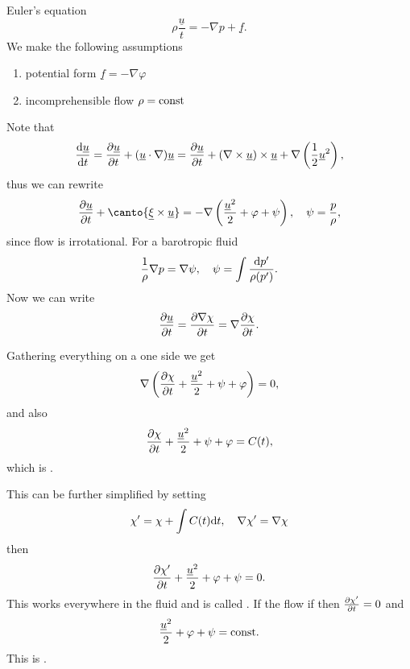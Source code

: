 \documentclass[11pt,oneside]{book}
\renewcommand{\vec}[1]{\underline{#1}}
\theoremstyle{definition} %
\theoremstyle{plain} %
\theoremstyle{remark} %
\theoremstyle{underline}
\newcommand\Ccancel[2][black]{
    \let\OldcancelColor\CancelColor
    \renewcommand\CancelColor{\color{#1}}
    \cancel{#2}
    \renewcommand\CancelColor{\OldcancelColor}
}
\let\OldcancelColor\CancelColor
\renewcommand\CancelColor{\color{#1}}
\renewcommand\CancelColor{\OldcancelColor}
\begin{document}
  Euler's equation
  \begin{displaymath}
    \rho\dfrac{\vec u}{t} = - \nabla p + \vec f.
  \end{displaymath}
  We make the following assumptions
  \begin{enumerate}
    \item potential form $\vec f = - \nabla \varphi$
    \item incomprehensible flow $\rho = \textrm{const}$
  \end{enumerate}
  Note that
  \begin{displaymath}
    \dfrac{\vec u}{t} = \ptf{\vec u}{t} + (\vec u \cdot \nabla ) \vec u 
    = \ptf{\vec u}{t} + (\nabla \times \vec u) \times \vec u + \nabla \left( \frac{1}{2} \vec u^2 \right),
  \end{displaymath}
  thus we can rewrite
  \begin{displaymath}
    \ptf{\vec u}{t} + 
    \canto{\vec \xi \times \vec u}
    = - \nabla \left( \frac{\vec u^2}{2} + \varphi + \psi\right) , \quad \psi = \frac{p}{\rho},
  \end{displaymath}
  since flow is irrotational.
  For a barotropic fluid
  \begin{displaymath}
    \frac{1}{\rho} \nabla p = \nabla \psi, \quad \psi = \int\frac{\mathrm{d} p'}{\rho(p')}.
  \end{displaymath}
  Now we can write
  \begin{displaymath}
    \ptf{\vec u}{t} = \ptf{\nabla \chi}{t} = \nabla \ptf{\chi}{t}.
  \end{displaymath}
  
  Gathering everything on a one side we get
  \begin{displaymath}
    \nabla \left( \ptf{\chi}{t} + \frac{\vec u^2}{2} + \psi + \varphi \right) = 0,
  \end{displaymath}
  and also
  \begin{displaymath}
    \ptf{\chi}{t} + \frac{\vec u^2}{2} + \psi + \varphi  = C(t),
  \end{displaymath}
  which is .

  This can be further simplified by setting
  \begin{displaymath}
    \chi' = \chi + \int C(t) \mathrm{d} t, \quad \nabla \chi' = \nabla \chi
  \end{displaymath}
  then
  \begin{displaymath}
    \ptf{\chi'}{t} + \frac{\vec u^2}{2} + \varphi + \psi = 0.
  \end{displaymath}
  This works everywhere in the fluid and is called .
  If the flow if  then $\frac{\partial \chi'}{\partial t} = 0$ and
  \begin{displaymath}
    \frac{\vec u^2}{2} + \varphi + \psi = \const.
  \end{displaymath}
  This is .
\end{document}
